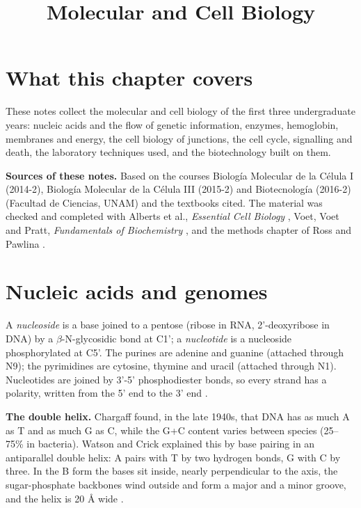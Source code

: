 



\title{Molecular and Cell Biology}
\maketitle

\label{section-phantom}

\tableofcontents

\section{What this chapter covers}
\label{section-mcb-overview}

These notes collect the molecular and cell
biology of the first three undergraduate
years: nucleic acids and the flow of genetic
information, enzymes, hemoglobin, membranes
and energy, the cell biology of junctions,
the cell cycle, signalling and death, the
laboratory techniques used, and the
biotechnology built on them.

\textbf{Sources of these notes.}
Based on the courses Biología Molecular de
la Célula I (2014-2), Biología Molecular de
la Célula III (2015-2) and Biotecnología
(2016-2) (Facultad de Ciencias, UNAM)
and the textbooks cited. The material was checked
and completed with Alberts et al.,
\emph{Essential Cell Biology}
\cite{alberts2014essential}, Voet, Voet and
Pratt, \emph{Fundamentals of Biochemistry}
\cite{voet2013fundamentals}, and the methods
chapter of Ross and Pawlina
\cite{ross2011histology}.

\section{Nucleic acids and genomes}
\label{section-mcb-nucleic-acids}

A \emph{nucleoside} is a base joined to a
pentose (ribose in RNA, 2'-deoxyribose in
DNA) by a $\beta$-N-glycosidic bond at C1'; a
\emph{nucleotide} is a nucleoside
phosphorylated at C5'. The purines are
adenine and guanine (attached through N9);
the pyrimidines are cytosine, thymine and
uracil (attached through N1). Nucleotides are
joined by 3'-5' phosphodiester bonds, so
every strand has a polarity, written from the
5' end to the 3' end \cite[Section
3-2]{voet2013fundamentals}.

\textbf{The double helix.}
Chargaff found, in the late 1940s, that DNA
has as much A as T and as much G as C, while
the G+C content varies between species
(25--75\% in bacteria). Watson and Crick
explained this by base pairing in an
antiparallel double helix: A pairs with T by
two hydrogen bonds, G with C by three. In the
B form the bases sit inside, nearly
perpendicular to the axis, the
sugar-phosphate backbones wind outside and
form a major and a minor groove, and the
helix is 20 \AA{} wide \cite[Sections 3-2 and
24-1]{voet2013fundamentals}.

